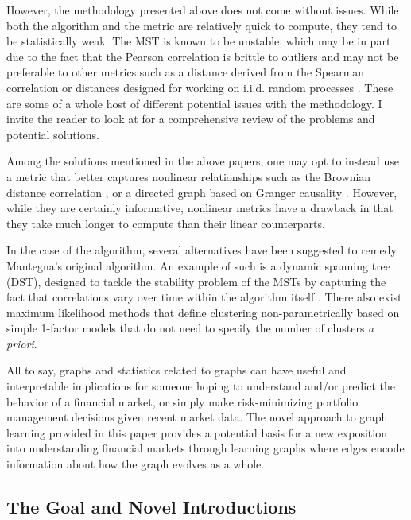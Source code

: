 \documentclass[12pt]{article}
\theoremstyle{definition}
\begin{document}
However, the methodology presented above does not come without issues. While both the algorithm and the metric are relatively quick to compute, they tend to be statistically weak. The MST is known to be unstable, which may be in part due to the fact that the Pearson correlation is brittle to outliers and may not be preferable to other metrics such as a distance derived from the Spearman correlation or distances designed for working on i.i.d. random processes \cite{marti2015proposal}\cite{marti2015generic}. These are some of a whole host of different potential issues with the methodology. I invite the reader to look at \cite{networkSurveyFinance} for a comprehensive review of the problems and potential solutions. 

Among the solutions mentioned in the above papers, one may  opt to instead use a metric that better captures nonlinear relationships such as the Brownian distance correlation \cite{distanceCorrelation}, or a directed graph based on Granger causality \cite{grangerCausalityNetworks}. However, while they are certainly informative, nonlinear metrics have a drawback in that they take much longer to compute than their linear counterparts.

In the case of the algorithm, several alternatives have been suggested to remedy Mantegna's original algorithm. An example of such is a dynamic spanning tree (DST), designed to tackle the stability problem of the MSTs by capturing the fact that correlations vary over time within the algorithm itself \cite{dynamicSpanningTrees}. There also exist maximum likelihood methods \cite{mleClustering} that define clustering non-parametrically based on simple 1-factor models that do not need to specify the number of clusters \textit{a priori}.

All to say, graphs and statistics related to graphs can have useful and interpretable implications for someone hoping to understand and/or predict the behavior of a financial market, or simply make risk-minimizing portfolio management decisions given recent market data. The novel approach to graph learning provided in this paper provides a potential basis for a new exposition into understanding financial markets through learning graphs where edges encode information about how the graph evolves as a whole.

\subsection{The Goal and Novel Introductions}
\label{sec:projectGoal}
\end{document}
